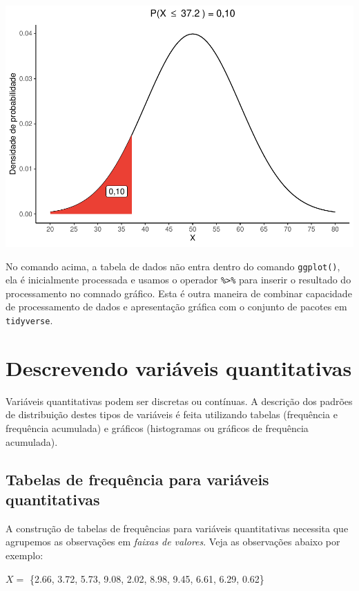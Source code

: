 \documentclass[
]{book}
\begin{document}
\includegraphics{probest-cambientais_files/figure-latex/unnamed-chunk-86-1.pdf}

No comando acima, a tabela de dados não entra dentro do comando \texttt{ggplot()}, ela é inicialmente processada e usamos o operador \texttt{\%\textgreater{}\%} para inserir o resultado do processamento no comnado gráfico. Esta é outra maneira de combinar capacidade de processamento de dados e apresentação gráfica com o conjunto de pacotes em \texttt{tidyverse}.

\hypertarget{varquant}{%
\chapter{Descrevendo variáveis quantitativas}\label{varquant}}

Variáveis quantitativas podem ser discretas ou contínuas. A descrição dos padrões de distribuição destes tipos de variáveis é feita utilizando tabelas (frequência e frequência acumulada) e gráficos (histogramas ou gráficos de frequência acumulada).

\hypertarget{tabelas-de-frequuxeancia-para-variuxe1veis-quantitativas}{%
\section{Tabelas de frequência para variáveis quantitativas}\label{tabelas-de-frequuxeancia-para-variuxe1veis-quantitativas}}

A construção de tabelas de frequências para variáveis quantitativas necessita que agrupemos as observações em \emph{faixas de valores}. Veja as observações abaixo por exemplo:

\(X =\) \{2.66, 3.72, 5.73, 9.08, 2.02, 8.98, 9.45, 6.61, 6.29, 0.62\}
\end{document}
